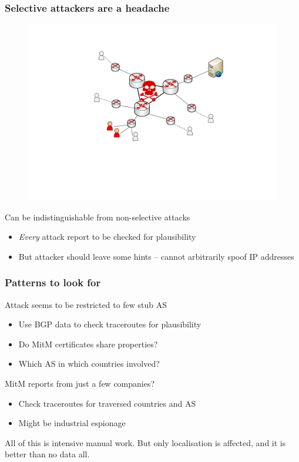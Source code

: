 \begin{frame}
\frametitle{Selective attackers are a headache}
  \begin{figure}[t]
    \centering
    \includegraphics[scale=.3]{figures/scenario4-core-selective.pdf}
  \end{figure}
\begin{block}{Can be indistinguishable from non-selective attacks}
  \begin{itemize}
    \item \textit{Every} attack report to be checked for plausibility
    \item But attacker should leave some hints -- cannot arbitrarily spoof IP addresses
  \end{itemize}
\end{block}
\end{frame}



\begin{frame}
\frametitle{Patterns to look for}
\begin{block}{Attack seems to be restricted to few stub AS}
  \begin{itemize}
    \item Use BGP data to check traceroutes for plausibility
    \item Do MitM certificates share properties?
    \item Which AS in which countries involved?
  \end{itemize}
\end{block}
\begin{block}{MitM reports from just a few companies?}
  \begin{itemize}
    \item Check traceroutes for traversed countries and AS
    \item Might be industrial espionage
  \end{itemize}
\end{block}
\begin{block}{All of this is intensive manual work. But only localisation is affected, and it is better than no data all.}\end{block}
\end{frame}



